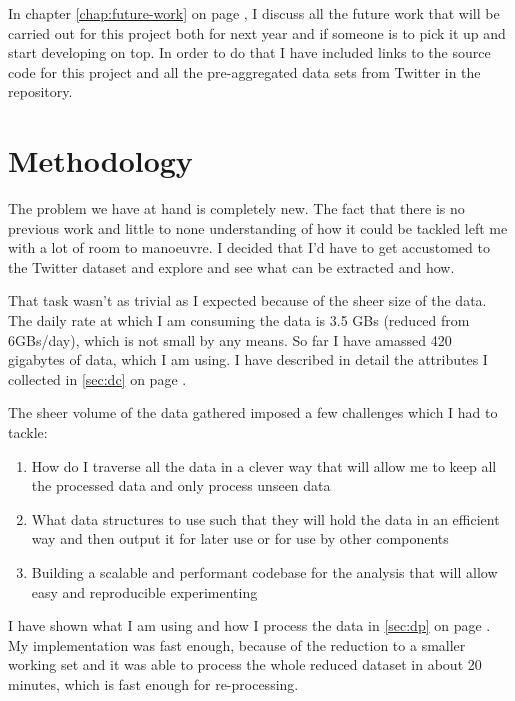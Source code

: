\documentclass[minf,frontabs,twoside,singlespacing,parskip]{infthesis}
\begin{document}
In chapter \ref{chap:future-work} on page \pageref{chap:future-work}, I discuss all the future work that will be carried out for this project both for next year and if someone is to pick it up and start developing on top. In order to do that I have included links to the source code for this project and all the pre-aggregated data sets from Twitter in the repository.













\chapter{Methodology}
\label{chap:method}

The problem we have at hand is completely new. The fact that there is no previous work and little to none understanding of how it could be tackled left me with a lot of room to manoeuvre. I decided that I'd have to get accustomed to the Twitter dataset and explore and see what can be extracted and how. 


That task wasn't as trivial as I expected because of the sheer size of the data. The daily rate at which I am consuming the data is 3.5 GBs (reduced from 6GBs/day), which is not small by any means. So far I have amassed 420 gigabytes of data, which I am using. I have described in detail the attributes I collected in \ref{sec:dc} on page \pageref{sec:dc}. 


The sheer volume of the data gathered imposed a few challenges which I had to tackle:
\begin{enumerate}
\item How do I traverse all the data in a clever way that will allow me to keep all the processed data and only process unseen data
\item What data structures to use such that they will hold the data in an efficient way and then output it for later use or for use by other components
\item Building a scalable and performant codebase for the analysis that will allow easy and reproducible experimenting
\end{enumerate}

I have shown what I am using and how I process the data in \ref{sec:dp} on page \pageref{sec:dp}. My implementation was fast enough, because of the reduction to a smaller working set and it was able to process the whole reduced dataset in about 20 minutes, which is fast enough for re-processing.
\end{document}
